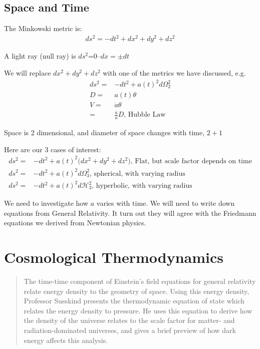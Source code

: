 \documentclass[]{article}
\begin{document}
 \subsection{Space and Time}
 
 The Minkowski metric is:
 \begin{align*}
 	ds^2 = - dt^2 + dx^2 + dy^2 + dz^2 
 \end{align*}
 
 A light ray (null ray) is $ds^2$=0--$dx=\pm dt$
 
 We will replace $ dx^2 + dy^2 + dz^2 $ with one of the metrics we have discussed, e.g.
  \begin{align*}
 	ds^2 =& - dt^2 + a(t)^2d\Omega_2^2\\
 	D =& a(t) \theta\\
 	V =& \dot{a}\theta\\ 
 	=& \frac{\dot{a}}{a} D \text{, Hubble Law}
 \end{align*}
 
  Space is 2 dimensional, and diameter of space changes with time, $2+1$
  
 Here are our 3 cases of interest:
 \begin{align*}
 	ds^2 =& -dt^2 + a(t)^2 \big( dx^2 + dy^2 + dz^2 \big) \text{, Flat, but scale factor depends on time}\\
 	ds^2 =& - dt^2 + a(t)^2d\Omega_3^2 \text{, spherical, with varying radius}\\
 	ds^2 =& - dt^2 + a(t)^2d\mathcal{H}_3^2 \text{, hyperbolic, with varying radius}
 \end{align*}

We need to investigate how $a$ varies with time. We will need to write down equations from General Relativity. It turn out they will agree with the Friedmann equations we derived from Newtonian physics.
\section{Cosmological Thermodynamics}\label{sec:cosmological:thermodynamics}

\begin{quotation}
	The time-time component of Einstein's field equations for general relativity relate energy density to the geometry of space.  Using this energy density, Professor Susskind presents the thermodynamic equation of state which relates the energy density to pressure.  He uses this equation to derive how the density of the universe relates to the scale factor for matter- and radiation-dominated universes, and gives a brief preview of how dark energy affects this analysis.
\end{quotation}
\end{document}
